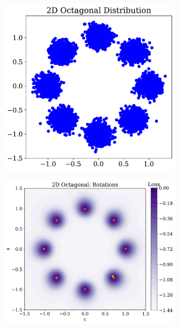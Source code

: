 \begin{figure}
    \centering
    \begin{subfigure}[b]{0.27\textwidth}
        \centering
        \includegraphics[height=\textwidth]{figures/chapter-09/2d_circularplot.pdf}
        \caption{}
        \label{fig:otherdistributions_2D_i}
    \end{subfigure}
    \hfill
    \begin{subfigure}[b]{0.28\textwidth}
        \centering
        \includegraphics[height=\textwidth]{figures/chapter-09/2doctagonalrotations.pdf}

\end{subfigure}
\end{figure}
